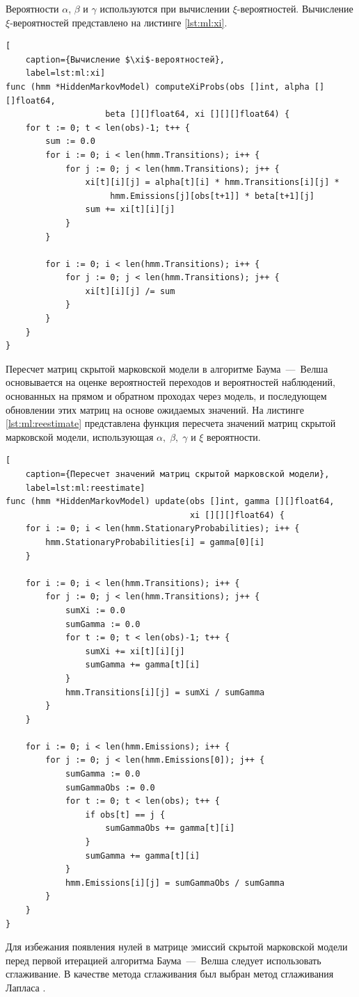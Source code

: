 Вероятности $\alpha$, $\beta$ и $\gamma$ используются при вычислении $\xi$-вероятностей. Вычисление $\xi$-вероятностей представлено на листинге  \ref{lst:ml:xi}.
\begin{lstlisting}[
	caption={Вычисление $\xi$-вероятностей},
	label=lst:ml:xi]
func (hmm *HiddenMarkovModel) computeXiProbs(obs []int, alpha [][]float64, 
					beta [][]float64, xi [][][]float64) {
	for t := 0; t < len(obs)-1; t++ {
		sum := 0.0
		for i := 0; i < len(hmm.Transitions); i++ {
			for j := 0; j < len(hmm.Transitions); j++ {
				xi[t][i][j] = alpha[t][i] * hmm.Transitions[i][j] *
					 hmm.Emissions[j][obs[t+1]] * beta[t+1][j]
				sum += xi[t][i][j]
			}
		}
		
		for i := 0; i < len(hmm.Transitions); i++ {
			for j := 0; j < len(hmm.Transitions); j++ {
				xi[t][i][j] /= sum
			}
		}
	}
}
\end{lstlisting}

Пересчет матриц скрытой марковской модели в алгоритме Баума~---~Велша основывается на оценке вероятностей переходов и вероятностей наблюдений, основанных на прямом и обратном проходах через модель, и последующем обновлении этих матриц на основе ожидаемых значений. На листинге \ref{lst:ml:reestimate} представлена функция пересчета значений матриц скрытой марковской модели, использующая $\alpha,\;\beta,\;\gamma$ и $\xi$ вероятности.

\begin{lstlisting}[
	caption={Пересчет значений матриц скрытой марковской модели},
	label=lst:ml:reestimate]
func (hmm *HiddenMarkovModel) update(obs []int, gamma [][]float64,
									 xi [][][]float64) {
	for i := 0; i < len(hmm.StationaryProbabilities); i++ {
		hmm.StationaryProbabilities[i] = gamma[0][i]
	}
	
	for i := 0; i < len(hmm.Transitions); i++ {
		for j := 0; j < len(hmm.Transitions); j++ {
			sumXi := 0.0
			sumGamma := 0.0
			for t := 0; t < len(obs)-1; t++ {
				sumXi += xi[t][i][j]
				sumGamma += gamma[t][i]
			}
			hmm.Transitions[i][j] = sumXi / sumGamma
		}
	}
	
	for i := 0; i < len(hmm.Emissions); i++ {
		for j := 0; j < len(hmm.Emissions[0]); j++ {
			sumGamma := 0.0
			sumGammaObs := 0.0
			for t := 0; t < len(obs); t++ {
				if obs[t] == j {
					sumGammaObs += gamma[t][i]
				}
				sumGamma += gamma[t][i]
			}
			hmm.Emissions[i][j] = sumGammaObs / sumGamma
		}
	}
}
\end{lstlisting}
Для избежания появления нулей в матрице эмиссий скрытой марковской модели перед первой итерацией алгоритма Баума~---~Велша следует использовать сглаживание. В качестве метода сглаживания был выбран метод сглаживания Лапласа \cite{smooting}. 

